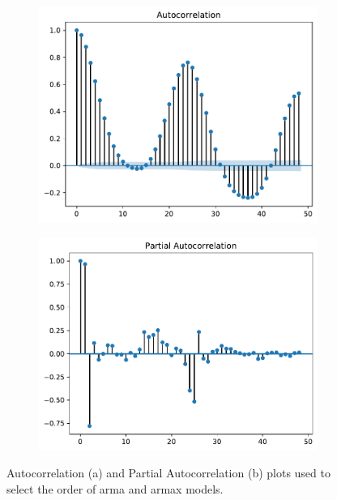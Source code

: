 \begin{figure}[h!]%
	\centering
	\begin{subfigure}{.5\textwidth}
		\centering
		\includegraphics[width=\textwidth]{plots/ACF/load_48lags_ndiff0_hstep1}%
		\caption{}
		\label{fig:acf_load_lags48}%
	\end{subfigure}%
	\begin{subfigure}{.5\textwidth}
		\centering
		\includegraphics[width=\textwidth]{plots/PACF/load_48lags_ndiff0_hstep1}%
		\caption{}
		\label{fig:pacf_load_lags48}%
	\end{subfigure}
	\caption{Autocorrelation (a) and Partial Autocorrelation (b) plots used to select the order of \acrshort{arma} and \acrshort{armax} models.}
	\label{fig:acf_compare}
\end{figure}

